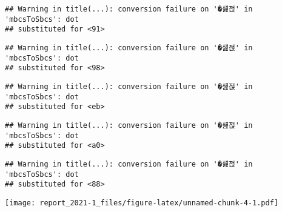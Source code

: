 \documentclass[
]{article}
\newenvironment{Shaded}{\begin{snugshade}}{\end{snugshade}}
\newcommand{\AttributeTok}[1]{\textcolor[rgb]{0.77,0.63,0.00}{#1}}
\newcommand{\DecValTok}[1]{\textcolor[rgb]{0.00,0.00,0.81}{#1}}
\newcommand{\FunctionTok}[1]{\textcolor[rgb]{0.00,0.00,0.00}{#1}}
\newcommand{\NormalTok}[1]{#1}
\newcommand{\SpecialCharTok}[1]{\textcolor[rgb]{0.00,0.00,0.00}{#1}}
\newcommand{\StringTok}[1]{\textcolor[rgb]{0.31,0.60,0.02}{#1}}
\begin{document}
\begin{verbatim}
## Warning in title(...): conversion failure on '�섎젅' in 'mbcsToSbcs': dot
## substituted for <91>
\end{verbatim}

\begin{verbatim}
## Warning in title(...): conversion failure on '�섎젅' in 'mbcsToSbcs': dot
## substituted for <98>
\end{verbatim}

\begin{verbatim}
## Warning in title(...): conversion failure on '�섎젅' in 'mbcsToSbcs': dot
## substituted for <eb>
\end{verbatim}

\begin{verbatim}
## Warning in title(...): conversion failure on '�섎젅' in 'mbcsToSbcs': dot
## substituted for <a0>
\end{verbatim}

\begin{verbatim}
## Warning in title(...): conversion failure on '�섎젅' in 'mbcsToSbcs': dot
## substituted for <88>
\end{verbatim}

\begin{Shaded}
\end{Shaded}

\texttt{[image: report\_2021-1\_files/figure-latex/unnamed-chunk-4-1.pdf]}
\end{document}
